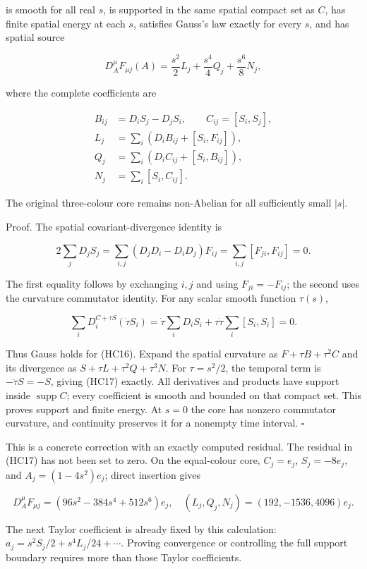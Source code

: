\documentclass[11pt]{article}
\begin{document}
is smooth for all real \(s\), is supported in the same spatial compact
set as \(C\), has finite spatial energy at each \(s\), satisfies Gauss's
law exactly for every \(s\), and has spatial source

\[
 D_A^\mu F_{\mu j}(A)
 =\frac{s^2}{2}L_j+\frac{s^4}{4}Q_j+\frac{s^6}{8}N_j,
 \tag{HC17}
\]

where the complete coefficients are

\[
 \begin{aligned}
 B_{ij}&=D_iS_j-D_jS_i,\qquad C_{ij}=[S_i,S_j],\\
 L_j&=\sum_i\left(D_iB_{ij}+[S_i,F_{ij}]\right),\\
 Q_j&=\sum_i\left(D_iC_{ij}+[S_i,B_{ij}]\right),\\
 N_j&=\sum_i[S_i,C_{ij}].
 \end{aligned}\tag{HC18}
\]

The original three-colour core remains non-Abelian for all sufficiently
small \(|s|\).

Proof. The spatial covariant-divergence identity is

\[
 2\sum_jD_jS_j
 =\sum_{i,j}(D_jD_i-D_iD_j)F_{ij}
 =\sum_{i,j}[F_{ji},F_{ij}]=0.
 \tag{HC19}
\]

The first equality follows by exchanging \(i,j\) and using
\(F_{ji}=-F_{ij}\); the second uses the curvature commutator identity.
For any scalar smooth function \(\tau(s)\),

\[
 \sum_iD_i^{C+\tau S}(\dot\tau S_i)
 =\dot\tau\sum_iD_iS_i+\tau\dot\tau\sum_i[S_i,S_i]=0.
\]

Thus Gauss holds for (HC16). Expand the spatial curvature as
\(F+\tau B+\tau^2 C\) and its divergence as
\(S+\tau L+\tau^2Q+\tau^3N\). For \(\tau=s^2/2\), the temporal term
is \(-\ddot\tau S=-S\), giving (HC17) exactly. All derivatives and
products have support inside \(\operatorname{supp}C\); every coefficient
is smooth and bounded on that compact set. This proves support and
finite energy. At \(s=0\) the core has nonzero commutator curvature,
and continuity preserves it for a nonempty time interval. \(\square\)

This is a concrete correction with an exactly computed residual. The
residual in (HC17) has not been set to zero. On the equal-colour core,
\(C_j=e_j\), \(S_j=-8e_j\), and \(A_j=(1-4s^2)e_j\); direct insertion gives

\[
 D_A^\mu F_{\mu j}
 =(96s^2-384s^4+512s^6)e_j,
 \quad (L_j,Q_j,N_j)=(192,-1536,4096)e_j.
 \tag{HC20}
\]

The next Taylor coefficient is already fixed by this calculation:
\(a_j=s^2S_j/2+s^4L_j/24+\cdots\). Proving convergence or controlling
the full support boundary requires more than those Taylor coefficients.
\end{document}

